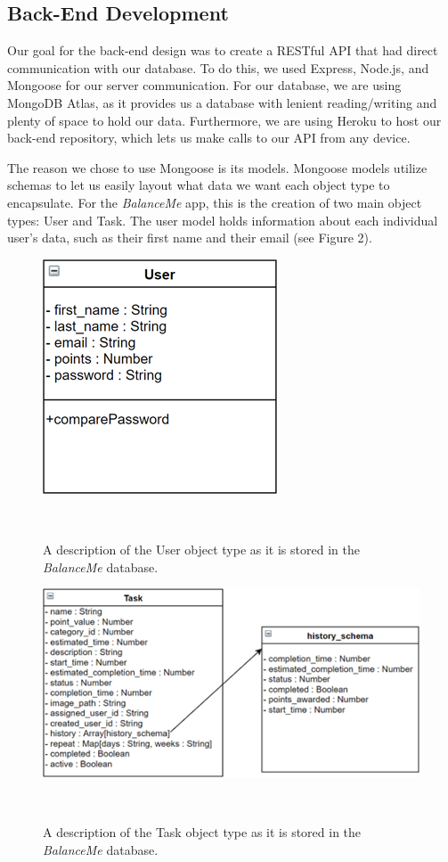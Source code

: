 \documentclass{sigchi}
\begin{document}
\subsection{Back-End Development}
Our goal for the back-end design was to create a RESTful API that had direct
communication with our database. To do this, we used Express, Node.js, and
Mongoose for our server communication. For our database, we are using MongoDB
Atlas, as it provides us a database with lenient reading/writing and plenty of
space to hold our data. Furthermore, we are using Heroku to host our back-end
repository, which lets us make calls to our API from any device.

The reason we chose to use Mongoose is its models. Mongoose models utilize
schemas to let us easily layout what data we want each object type to
encapsulate. For the \textit{BalanceMe} app, this is the creation of two main
object types: User and Task. The user model holds information about each
individual user’s data, such as their first name and their email (see Figure 2).

\begin{figure}
\centering
  \includegraphics[width=0.6\columnwidth]{figures/user}
  \caption{A description of the User object type as it is stored in the
	\textit{BalanceMe} database. }~\label{fig:figure2}
\end{figure}

\begin{figure}
\centering
  \includegraphics[width=1.0\columnwidth]{figures/task}
  \caption{A description of the Task object type as it is stored in the
	\textit{BalanceMe} database. }~\label{fig:figure3}
\end{figure}
\end{document}
